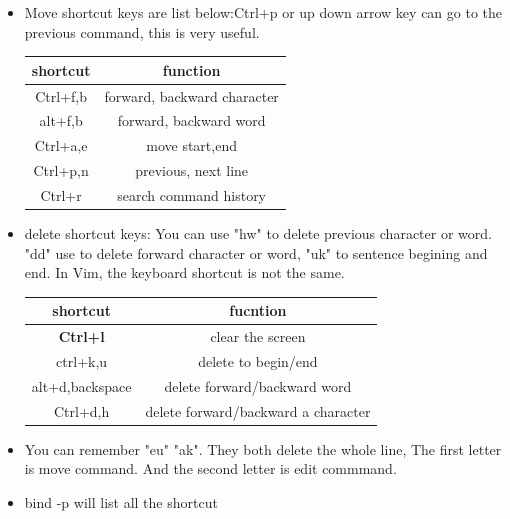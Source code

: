 \documentclass[a4paper,12pt,twoside]{book}
\begin{document}
 \begin{itemize}
  \item Move shortcut keys are list below:Ctrl+p or up down arrow key can go to the previous command, this is very useful. 
\begin{center}
  \begin{tabular}{c|c}
 \hline shortcut & function \\
\hline Ctrl+f,b & forward, backward character \\
\hline alt+f,b & forward, backward word \\
\hline Ctrl+a,e & move start,end \\
\hline Ctrl+p,n & previous, next line \\
\hline Ctrl+r & search command history \\
 \hline
  \end{tabular}
\end{center}

\item delete shortcut keys: You can use "hw" to delete previous character or word. "dd" use to delete forward character or word, "uk" to sentence begining and end. In Vim, the keyboard shortcut is not the same. 
\begin{center}
  \begin{tabular}{|c|c|}
 \hline shortcut & fucntion \\
 \hline \textbf{Ctrl+l} & clear the screen \\	
\hline ctrl+k,u & delete to begin/end \\
\hline alt+d,backspace & delete forward/backward word \\
\hline Ctrl+d,h  & delete forward/backward a character  \\
 \hline
  \end{tabular}
\end{center}

\item You can remember "eu" "ak". They both delete the whole line, The first letter is move command. And the second letter is edit commmand. 

\item bind -p will list all the shortcut


\end{itemize}
\end{document}
